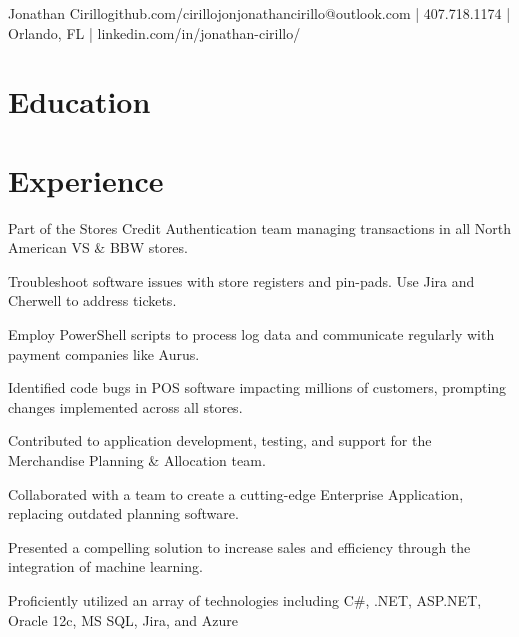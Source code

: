 \documentclass[]{deedy-resume-openfont}
\begin{document}
%
%


\namesection \LARGE {{Jonathan} {Cirillo}}{github.com/cirillojon}{jonathancirillo@outlook.com | 407.718.1174 | Orlando, FL | linkedin.com/in/jonathan-cirillo/}

\hspace{\parindent}

\section{Education}
\sectionsep

\section{Experience}

\vspace{\topsep} 

\begin{tightemize}
\item Part of the Stores Credit Authentication team managing transactions in all North American VS \& BBW stores.
\item Troubleshoot software issues with store registers and pin-pads. Use Jira and Cherwell to address tickets. 
\item Employ PowerShell scripts to process log data and communicate regularly with payment companies like Aurus.
\item Identified code bugs in POS software impacting millions of customers, prompting changes implemented across all stores.
\end{tightemize}
\sectionsep

\begin{tightemize}
\item Contributed to application development, testing, and support for the Merchandise Planning \& Allocation team.
\item Collaborated with a team to create a cutting-edge Enterprise Application, replacing outdated planning software.  
\item Presented a compelling solution to increase sales and efficiency through the integration of machine learning.
\item Proficiently utilized an array of technologies including C\#, .NET, ASP.NET, Oracle 12c, MS SQL, Jira, and Azure
\end{tightemize}
\sectionsep
\end{document}

